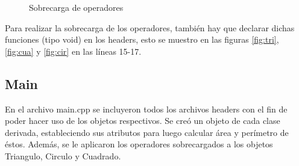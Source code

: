 \documentclass[11pt]{article}
\begin{document}
\begin{figure}[H]
\centering
{}
\caption{Sobrecarga de operadores}
\label{fig:sobrecarga}
\end{figure}

Para realizar la sobrecarga de los operadores, también hay que declarar dichas funciones (tipo void) en los headers, esto se muestro en las figuras \ref{fig:tri}, \ref{fig:cua} y \ref{fig:cir} en las líneas 15-17.

\subsection{Main}
En el archivo main.cpp se incluyeron todos los archivos headers con el fin de poder hacer uso de los objetos respectivos. 
Se creó un objeto de cada clase derivada, estableciendo sus atributos para luego calcular área y perímetro de éstos. Además, se le aplicaron los operadores sobrecargados a los objetos Triangulo, Circulo y Cuadrado.
 
\end{document}
